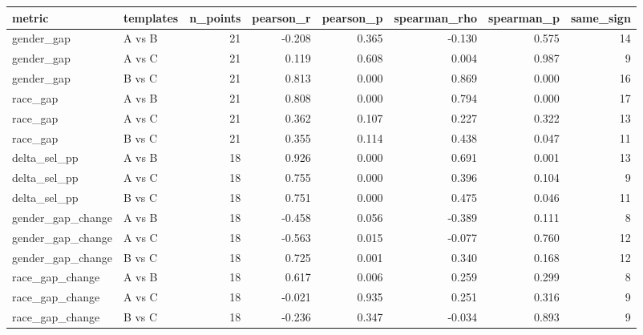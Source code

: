 \begin{tabular}{llrrrrrr}
\toprule
metric & templates & n\_points & pearson\_r & pearson\_p & spearman\_rho & spearman\_p & same\_sign \\
\midrule
gender\_gap & A vs B & 21 & -0.208 & 0.365 & -0.130 & 0.575 & 14 \\
gender\_gap & A vs C & 21 & 0.119 & 0.608 & 0.004 & 0.987 & 9 \\
gender\_gap & B vs C & 21 & 0.813 & 0.000 & 0.869 & 0.000 & 16 \\
race\_gap & A vs B & 21 & 0.808 & 0.000 & 0.794 & 0.000 & 17 \\
race\_gap & A vs C & 21 & 0.362 & 0.107 & 0.227 & 0.322 & 13 \\
race\_gap & B vs C & 21 & 0.355 & 0.114 & 0.438 & 0.047 & 11 \\
delta\_sel\_pp & A vs B & 18 & 0.926 & 0.000 & 0.691 & 0.001 & 13 \\
delta\_sel\_pp & A vs C & 18 & 0.755 & 0.000 & 0.396 & 0.104 & 9 \\
delta\_sel\_pp & B vs C & 18 & 0.751 & 0.000 & 0.475 & 0.046 & 11 \\
gender\_gap\_change & A vs B & 18 & -0.458 & 0.056 & -0.389 & 0.111 & 8 \\
gender\_gap\_change & A vs C & 18 & -0.563 & 0.015 & -0.077 & 0.760 & 12 \\
gender\_gap\_change & B vs C & 18 & 0.725 & 0.001 & 0.340 & 0.168 & 12 \\
race\_gap\_change & A vs B & 18 & 0.617 & 0.006 & 0.259 & 0.299 & 8 \\
race\_gap\_change & A vs C & 18 & -0.021 & 0.935 & 0.251 & 0.316 & 9 \\
race\_gap\_change & B vs C & 18 & -0.236 & 0.347 & -0.034 & 0.893 & 9 \\
\bottomrule
\end{tabular}
